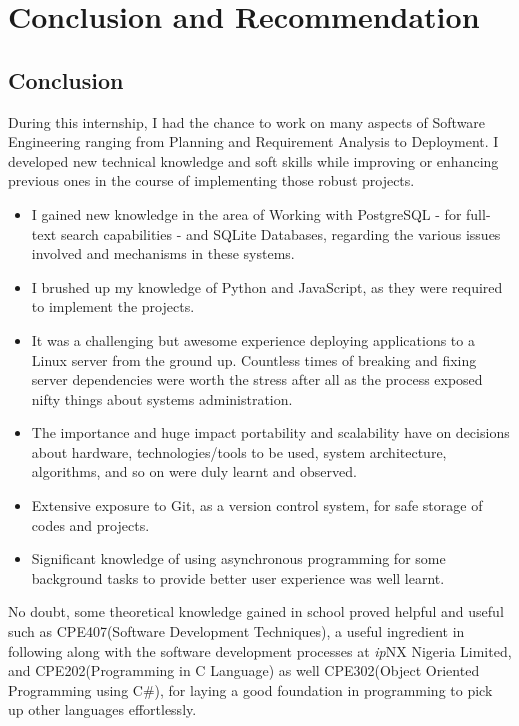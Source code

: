 \chapter{Conclusion and Recommendation}
\section{Conclusion}
During this internship, I had the chance to work on many aspects of Software Engineering ranging from Planning and Requirement Analysis to Deployment. I developed new technical knowledge and soft skills while improving or enhancing previous ones in the course of implementing those robust projects.
\begin{itemize}
	\item I gained new knowledge in the area of Working with PostgreSQL - for full-text search capabilities - and SQLite Databases, regarding the various issues involved and mechanisms in these systems.
	\item I brushed up my knowledge of Python and JavaScript, as they were required to implement the projects.
	\item It was a challenging but awesome experience deploying applications to a Linux server from the ground up. Countless times of breaking and fixing server dependencies were worth the stress after all as the process exposed nifty things about systems administration.
	\item The importance and huge impact portability and scalability have on decisions about hardware, technologies/tools to be used, system architecture, algorithms, and so on were duly learnt and observed.
	\item Extensive exposure to Git, as a version control system, for safe storage of codes and projects.
	\item Significant knowledge of using asynchronous programming for some background tasks to provide better user experience was well learnt. 
\end{itemize}
No doubt, some theoretical knowledge gained in school proved helpful and useful such as CPE407(Software Development Techniques), a useful ingredient in following along with the software development processes at \textit{ip}NX Nigeria Limited, and CPE202(Programming in C Language) as well CPE302(Object Oriented Programming using C\#), for laying a good foundation in programming to pick up other languages effortlessly.
